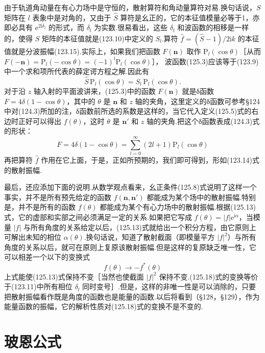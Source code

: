 由于轨道角动量在有心力场中是守恒的，散射算符和角动量算符对易.换句话说，$S$ 矩阵在 $l$ 表象中是对角的，又由于 $\hat{S}$ 算符是幺正的，它的本征值模量必等于1，亦即必具有 $\mathrm{e}^{2\mathrm{i}\delta_l}$ 的形式，而 $\delta_l$ 为实数.很易看出，这些 $\delta_l$ 和波函数的相移是一样的，使得 $S$ 矩阵的本征值就是(123.10)中定义的 $S_l$.算符 $\hat{f}=(\hat{S}-1)/2\mathrm{i}k$ 的本征值就是分波振幅(123.15).实际上，如果我们把函数 $F(\boldsymbol{n})$ 取作 $\mathrm{P}_l(\cos\theta)$［从而
$F(-\boldsymbol{n})=\mathrm{P}_l(-\cos\theta)=(-1)^l\mathrm{P}_l(\cos\theta)$］，
波函数(125.3)应该等于(123.9)中一个求和项所代表的薛定谔方程之解.因此有
\begin{equation*}
  \hat{S}\,\mathrm{P}_l(\cos\theta)=S_l\,\mathrm{P}_l(\cos\theta).
\end{equation*}
对于沿 $z$ 轴入射的平面波讲来，(125.3)中的函数 $F(\boldsymbol{n})$ 就是δ函数 $F=4\delta(1-\cos\theta)$，其中的 $\theta$ 是 $\boldsymbol{n}$ 和 $z$ 轴的夹角，这里定义的δ函数可参考§124中对(124.3)所加的注，δ函数前所选的系数是这样的，当它代入定义(125.5)式的右边时正好可以得出 $f(\theta)$，这时 $\theta$ 是 $\boldsymbol{n}'$ 和 $z$ 轴的夹角.把这个δ函数表成(124.3)式的形状：
\begin{equation}
  F=4\delta(1-\cos\theta)=\sum_{l=0}^{\infty}(2l+1)
  \mathrm{P}_l(\cos\theta)
\end{equation}
再把算符 $\hat{f}$ 作用在它上面，于是，正如所预期的，我们即可得到，形如(123.14)式的散射振幅.

最后，还应添加下面的说明.从数学观点看来，幺正条件(125.8)式说明了这样一个事实，并不是所有预先给定的函数 $f(\boldsymbol{n},\boldsymbol{n}')$ 都能成为某个场中的散射振幅.特别是，并不是所有的函数 $f(\theta)$ 都能成为某个有心力场中的散射振幅.根据(125.13)式，它的虚部和实部之间必须满足一定的关系.如果把它写成 $f(\theta)=|f|\mathrm{e}^{\mathrm{i}\alpha}$，当模量 $|f|$ 与所有角度的关系给定以后，(125.13)式就给出一个积分方程，由它原则上可解出未知的相位 $\alpha(\theta)$.换句话说，知道了散射截面（即模量平方 $|f|^2$）与所有角度的关系以后，就可在原则上复原该散射振幅.但是这样的复原缺乏唯一性，它可以相差一个以下的变换式
\begin{equation}
  f(\theta)\to-f^{*}(\theta)
\end{equation}
上式能使(125.13)式保持不变［当然也使截面 $|f|^2$ 保持不变.(125.18)式的变换等价于(123.11)中所有相位 $\delta_l$ 同时变号］.但是，这样的非唯一性是可以消除的，只要把散射振幅看作既是角度的函数也是能量的函数.以后将看到（§128，§129），作为能量函数的振幅，它的解析性质对(125.18)式的变换不是不变的.

\section{玻恩公式}

